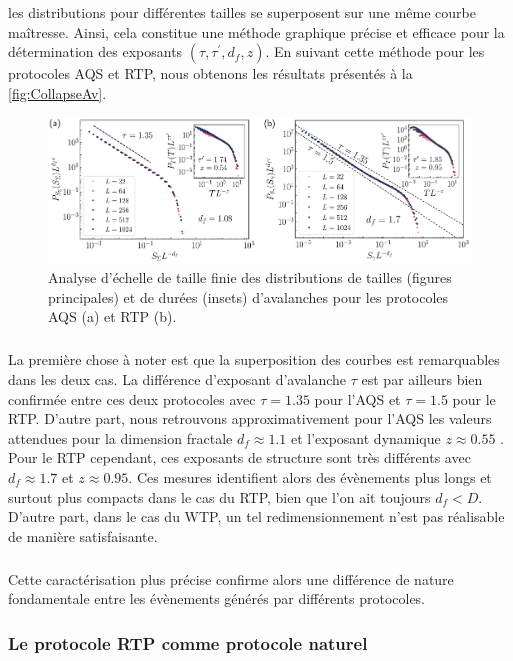\noindent les distributions pour différentes tailles se superposent sur une même courbe maîtresse. Ainsi, cela constitue une méthode graphique précise et efficace pour la détermination des exposants $(\tau, \tau^\prime, d_f, z)$. En suivant cette méthode pour les protocoles AQS et RTP, nous obtenons les résultats présentés à la \autoref{fig:CollapseAv}.

\begin{figure}[h]
	\centering
	\includegraphics[width=\textwidth]{Chapitre4/Figures/Avalanches/Collapse.pdf}
	\caption{Analyse d'échelle de taille finie des distributions de tailles (figures principales) et de durées (insets) d'avalanches pour les protocoles AQS (a) et RTP (b).}
	\label{fig:CollapseAv}
\end{figure}

\subparagraph{}La première chose à noter est que la superposition des courbes est remarquables dans les deux cas. La différence d'exposant d'avalanche $\tau$ est par ailleurs bien confirmée entre ces deux protocoles avec $\tau = 1.35$ pour l'AQS et $\tau=1.5$ pour le RTP. D'autre part, nous retrouvons approximativement pour l'AQS les valeurs attendues pour la dimension fractale $d_f\approx 1.1$ et l'exposant dynamique $z\approx 0.55$ \cite{liu_driving_2016, lin_scaling_2014}. Pour le RTP cependant, ces exposants de structure sont très différents avec $d_f \approx 1.7$ et $z\approx 0.95$. Ces mesures identifient alors des évènements plus longs et surtout plus compacts dans le cas du RTP, bien que l'on ait toujours $d_f < D$. D'autre part, dans le cas du WTP, un tel redimensionnement n'est pas réalisable de manière satisfaisante.

\subparagraph{}Cette caractérisation plus précise confirme alors une différence de nature fondamentale entre les évènements générés par différents protocoles.

\subsubsection{Le protocole RTP comme protocole naturel}

